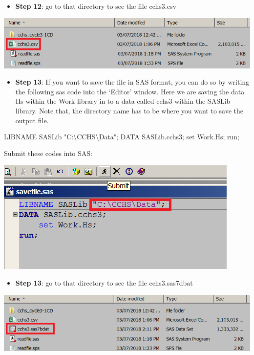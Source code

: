\documentclass[
]{book}
\newenvironment{Shaded}{\begin{snugshade}}{\end{snugshade}}
\newcommand{\NormalTok}[1]{#1}
\newcommand{\StringTok}[1]{\textcolor[rgb]{0.31,0.60,0.02}{#1}}
\providecommand{\tightlist}{%
  \setlength{\itemsep}{0pt}\setlength{\parskip}{0pt}}
\begin{document}
\begin{itemize}
\tightlist
\item
  \textbf{Step 12}: go to that directory to see the file cchs3.csv
\end{itemize}

\includegraphics[width=0.65\linewidth]{images/abacus25}

\begin{itemize}
\tightlist
\item
  \textbf{Step 13}: If you want to save the file in SAS format, you can do so by writing the following sas code into the `Editor' window. Here we are saving the data Hs within the Work library in to a data called cchs3 within the SASLib library. Note that, the directory name has to be where you want to save the output file.
\end{itemize}

\begin{Shaded}
\begin{Highlighting}[]
\NormalTok{LIBNAME SASLib }\StringTok{"C:\textbackslash{}CCHS\textbackslash{}Data"}\NormalTok{;}
\NormalTok{DATA SASLib.cchs3;}
\NormalTok{    set Work.Hs;}
\NormalTok{run;}
\end{Highlighting}
\end{Shaded}

Submit these codes into SAS:

\includegraphics[width=0.65\linewidth]{images/abacus26}

\begin{itemize}
\tightlist
\item
  \textbf{Step 13}: go to that directory to see the file cchs3.sas7dbat
\end{itemize}

\includegraphics[width=0.65\linewidth]{images/abacus27}
\end{document}
